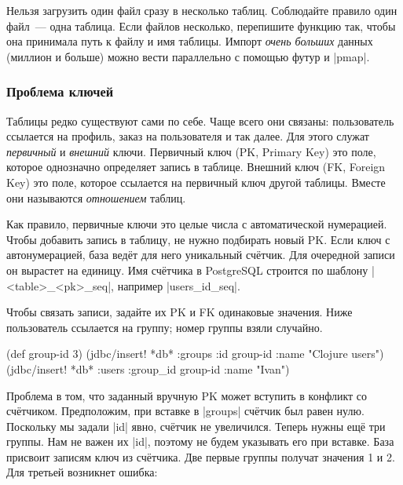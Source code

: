 Нельзя загрузить один файл сразу в несколько таблиц. Соблюдайте правило один
файл~--- одна таблица. Если файлов несколько, перепишите функцию так, чтобы она
принимала путь к файлу и имя таблицы. Импорт \emph{очень больших} данных
(миллион и больше) можно вести параллельно с помощью футур и \spverb|pmap|.

\subsubsection*{Проблема ключей}



Таблицы редко существуют сами по себе. Чаще всего они связаны: пользователь
ссылается на профиль, заказ на пользователя и так далее. Для этого служат
\emph{первичный} и \emph{внешний} ключи. Первичный ключ (PK, Primary Key) это
поле, которое однозначно определяет запись в таблице. Внешний ключ (FK, Foreign
Key) это поле, которое ссылается на первичный ключ другой таблицы. Вместе они
называются \emph{отношением} таблиц.


Как правило, первичные ключи это целые числа с автоматической нумерацией. Чтобы
добавить запись в таблицу, не нужно подбирать новый PK. Если ключ с
автонумерацией, база ведёт для него уникальный счётчик. Для очередной записи
он вырастет на единицу. Имя счётчика в PostgreSQL строится по шаблону
\spverb|<table>_<pk>_seq|, например \spverb|users_id_seq|.

Чтобы связать записи, задайте их PK и FK одинаковые значения. Ниже пользователь
ссылается на группу; номер группы взяли случайно.

\begin{english}
  \begin{clojure}
(def group-id 3)
(jdbc/insert! *db* :groups {:id group-id :name "Clojure users"})
(jdbc/insert! *db* :users {:group_id group-id :name "Ivan"})
  \end{clojure}
\end{english}

Проблема в том, что заданный вручную PK может вступить в конфликт со
счётчиком. Предположим, при вставке в \spverb|groups| счётчик был равен
нулю. Поскольку мы задали \spverb|id| явно, счётчик не увеличился. Теперь нужны
ещё три группы. Нам не важен их \spverb|id|, поэтому не будем указывать его при
вставке. База присвоит записям ключ из счётчика. Две первые группы получат
значения 1 и 2. Для третьей возникнет ошибка:

